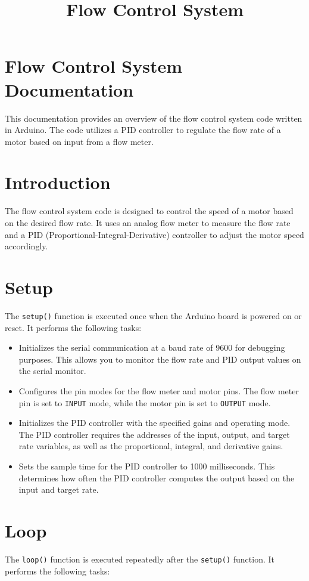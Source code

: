 \documentclass{article}
\title{\vspace{-4cm}Flow Control System}
\date{}
\author{}
\begin{document}
\maketitle

\section*{Flow Control System Documentation}

This documentation provides an overview of the flow control system code written in Arduino. The code utilizes a PID controller to regulate the flow rate of a motor based on input from a flow meter.

\section*{Introduction}
The flow control system code is designed to control the speed of a motor based on the desired flow rate. It uses an analog flow meter to measure the flow rate and a PID (Proportional-Integral-Derivative) controller to adjust the motor speed accordingly.

\section*{Setup}
The \texttt{setup()} function is executed once when the Arduino board is powered on or reset. It performs the following tasks:

\begin{itemize}
  \item Initializes the serial communication at a baud rate of 9600 for debugging purposes. This allows you to monitor the flow rate and PID output values on the serial monitor.
  \item Configures the pin modes for the flow meter and motor pins. The flow meter pin is set to \texttt{INPUT} mode, while the motor pin is set to \texttt{OUTPUT} mode.
  \item Initializes the PID controller with the specified gains and operating mode. The PID controller requires the addresses of the input, output, and target rate variables, as well as the proportional, integral, and derivative gains.
  \item Sets the sample time for the PID controller to 1000 milliseconds. This determines how often the PID controller computes the output based on the input and target rate.
\end{itemize}

\section*{Loop}
The \texttt{loop()} function is executed repeatedly after the \texttt{setup()} function. It performs the following tasks:
\end{document}
